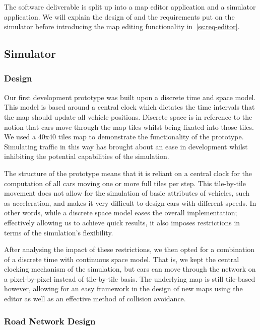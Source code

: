 The software deliverable is split up into a map editor application and a simulator application. We will explain the design of and the requirements put on the simulator before introducing the map editing functionality in~\ref{ss:req-editor}.

\subsection{Simulator}
\subsubsection{Design}
\label{subsec:design}
Our first development prototype was built upon a discrete time and space model. This model is based around a central clock which dictates the time intervals that the map should update all vehicle positions. Discrete space is in reference to the notion that cars move through the map tiles whilst being fixated into those tiles. We used a 40x40 tiles map to demonstrate the functionality of the prototype. Simulating traffic in this way has brought about an ease in development whilst inhibiting the potential capabilities of the simulation.

The structure of the prototype means that it is reliant on a central clock for the computation of all cars moving one or more full tiles per step. This tile-by-tile movement does not allow for the simulation of basic attributes of vehicles, such as acceleration, and makes it very difficult to design cars with different speeds. In other words, while a discrete space model eases the overall implementation; effectively allowing us to achieve quick results, it also imposes restrictions in terms of the simulation's flexibility.

After analysing the impact of these restrictions, we then opted for a combination of a discrete time with continuous space model. That is, we kept the central clocking mechanism of the simulation, but cars can move through the network on a pixel-by-pixel instead of tile-by-tile basis. The underlying map is still tile-based however, allowing for an easy framework in the design of new maps using the editor as well as an effective method of collision avoidance.

\subsubsection*{Road Network Design}

